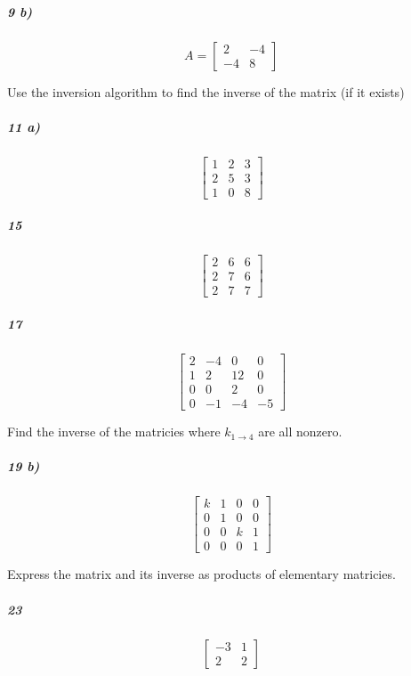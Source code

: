 \documentclass[fleqn]{article}
\begin{document}
\subparagraph{9 b)}

\[
A = \begin{bmatrix} 2 & -4 \\ -4 & 8 \end{bmatrix}
\]
\vfill


\pagebreak
 Use the inversion algorithm to find the inverse of the matrix (if it exists)

\subparagraph{11 a)}

\[
 \begin{bmatrix} 1 & 2 & 3 \\ 2 & 5 & 3 \\ 1 & 0 & 8 \end{bmatrix}
\]
\vfill



\subparagraph{15}

\[
\begin{bmatrix} 2 & 6 & 6 \\ 2 & 7 & 6 \\ 2 & 7 & 7 \end{bmatrix}
\]
\vfill


\pagebreak


\subparagraph{17}

\[
\begin{bmatrix} 2 & -4 & 0 & 0 \\ 1 & 2 & 12 & 0 \\ 0 & 0 & 2 & 0 \\ 0 & -1 & -4 & -5 \end{bmatrix}
\]
\vfill

 Find the inverse of the matricies where $k_{1 \to 4}$ are all nonzero.

\subparagraph{19 b)}

\[
\begin{bmatrix} k & 1 & 0 & 0 \\ 0 & 1 & 0 & 0 \\ 0 & 0 & k & 1 \\ 0 & 0 & 0 & 1 \end{bmatrix}
\]
\vfill


\pagebreak
 Express the matrix and its inverse as products of elementary matricies.

\subparagraph{23}

\[
\begin{bmatrix} -3 & 1 \\ 2 & 2 \end{bmatrix}
\]
\vfill
\end{document}
